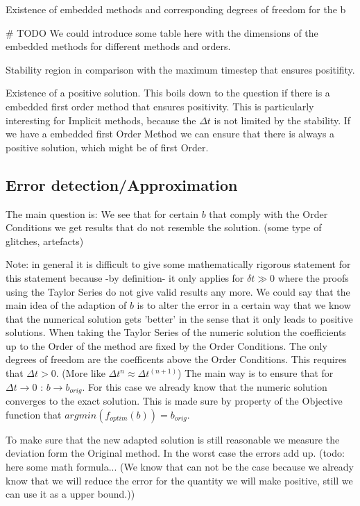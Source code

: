 \documentclass{article}
\begin{document}
Existence of embedded methods and corresponding degrees of freedom for the b

\# TODO We could introduce some table here with the dimensions of the embedded methods for different methods and orders.

Stability region in comparison with the maximum timestep that ensures positifity. 

Existence of a positive solution. This boils down to the question if there is a embedded first order method that ensures positivity. This is particularly interesting for Implicit methods, because the $\Delta t$ is not limited by the stability. 
If we have a embedded first Order Method we can ensure that there is always a positive solution, which might be of first Order. 

\subsection{Error detection/Approximation}
The main question is: We see that for certain $b$ that comply with the Order Conditions we get results that do not resemble the solution. (some type of glitches, artefacts)

Note: in general it is difficult to give some mathematically rigorous statement for this statement because -by definition- it only applies for $\delta t \gg 0$ where the proofs using the Taylor Series do not give valid results any more. We could say that the main idea of the adaption of $b$ is to alter the error in a certain way that we know that the numerical solution gets 'better' in the sense that it only leads to positive solutions. 
When taking the Taylor Series of the numeric solution the coefficients up to the Order of the method are fixed by the Order Conditions. The only degrees of freedom are the coefficents above the Order Conditions. This requires that $\Delta t > 0$. (More like $\Delta t^n \approx \Delta t^(n+1) $)
The main way is to ensure that for $\Delta t \to 0$ : $b \to b_{orig}$. For this case we already know that the numeric solution converges to the exact solution.  
This is made sure by property of the Objective function that $argmin(f_{optim}(b)) = b_{orig}$. 

To make sure that the new adapted solution is still reasonable we measure the deviation form the Original method. In the worst case the errors add up. (todo: here some math formula... (We know that can not be the case because we already know that we will reduce the error for the quantity we will make positive, still we can use it as a upper bound.))
\end{document}
